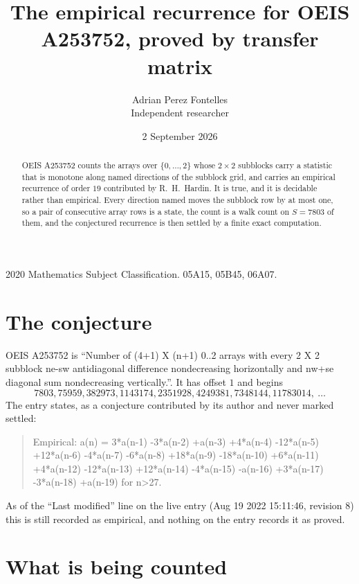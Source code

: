 \documentclass[11pt,a4paper]{article}
\title{The empirical recurrence for OEIS A253752, proved by transfer matrix}
\author{Adrian Perez Fontelles\\ \small Independent researcher}
\date{2 September 2026}
\theoremstyle{plain}
\theoremstyle{definition}
\begin{document}
\maketitle

\begin{abstract}
OEIS A253752 counts the arrays over $\{0,\dots,2\}$ whose $2\times2$ subblocks carry a
statistic that is monotone along named directions of the subblock grid, and carries an
empirical recurrence of order $19$ contributed by R.~H.~Hardin. It is true, and it is
decidable rather than empirical. Every direction named moves the subblock row by at most one,
so a pair of consecutive array rows is a state, the count is a walk count on $S=7803$ of them,
and the conjectured recurrence is then settled by a finite exact computation.
\end{abstract}

\noindent\small 2020 Mathematics Subject Classification. 05A15, 05B45, 06A07.\normalsize

\section{The conjecture}

OEIS A253752 is ``Number of (4+1) X (n+1) 0..2 arrays with every 2 X 2 subblock ne-sw antidiagonal difference nondecreasing horizontally and nw+se diagonal sum nondecreasing vertically.''. It has offset $1$ and begins
\[
7803, 75959, 382973, 1143174, 2351928, 4249381, 7348144, 11783014,\ \dots
\]
The entry states, as a conjecture contributed by its author and never marked settled:
\begin{quote}
Empirical: a(n) = 3*a(n-1) -3*a(n-2) +a(n-3) +4*a(n-4) -12*a(n-5) +12*a(n-6) -4*a(n-7) -6*a(n-8) +18*a(n-9) -18*a(n-10) +6*a(n-11) +4*a(n-12) -12*a(n-13) +12*a(n-14) -4*a(n-15) -a(n-16) +3*a(n-17) -3*a(n-18) +a(n-19) for n>27.
\end{quote}
As of the ``Last modified'' line on the live entry (Aug 19 2022 15:11:46, revision 8) this is still
recorded as empirical, and nothing on the entry records it as proved.

\section{What is being counted}
\end{document}
